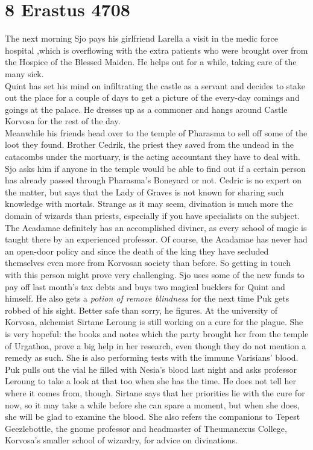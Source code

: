 \section{8 Erastus 4708}

The next morning Sjo pays his girlfriend Larella a visit in the medic force hospital ,which is overflowing with the extra patients who were brought over from the Hospice of the Blessed Maiden. He helps out for a while, taking care of the many sick.\\

Quint has set his mind on infiltrating the castle as a servant and decides to stake out the place for a couple of days to get a picture of the every-day comings and goings at the palace. He dresses up as a commoner and hangs around Castle Korvosa for the rest of the day.\\

Meanwhile his friends head over to the temple of Pharasma to sell off some of the loot they found. Brother Cedrik, the priest they saved from the undead in the catacombs under the mortuary, is the acting accountant they have to deal with. Sjo asks him if anyone in the temple would be able to find out if a certain person has already passed through Pharasma's Boneyard or not. Cedric is no expert on the matter, but says that the Lady of Graves is not known for sharing such knowledge with mortals. Strange as it may seem, divination is much more the domain of wizards than priests, especially if you have specialists on the subject. The Acadamae definitely has an accomplished diviner, as every school of magic is taught there by an experienced professor. Of course, the Acadamae has never had an open-door policy and since the death of the king they have secluded themselves even more from Korvosan society than before. So getting in touch with this person might prove very challenging. Sjo uses some of the new funds to pay off last month's tax debts and buys two magical bucklers for Quint and himself. He also gets a {\itshape potion of remove blindness} for the next time Puk gets robbed of his sight. Better safe than sorry, he figures. At the university of Korvosa, alchemist Sirtane Leroung is still working on a cure for the plague. She is very hopeful: the books and notes which the party brought her from the temple of Urgathoa, prove a big help in her research, even though they do not mention a remedy as such. She is also performing tests with the immune Varisians' blood. Puk pulls out the vial he filled with Nesia's blood last night and asks professor Leroung to take a look at that too when she has the time. He does not tell her where it comes from, though. Sirtane says that her priorities lie with the cure for now, so it may take a while before she can spare a moment, but when she does, she will be glad to examine the blood. She also refers the companions to Tepest Geezlebottle, the gnome professor and headmaster of Theumanexus College, Korvosa's smaller school of wizardry, for advice on divinations.\\

